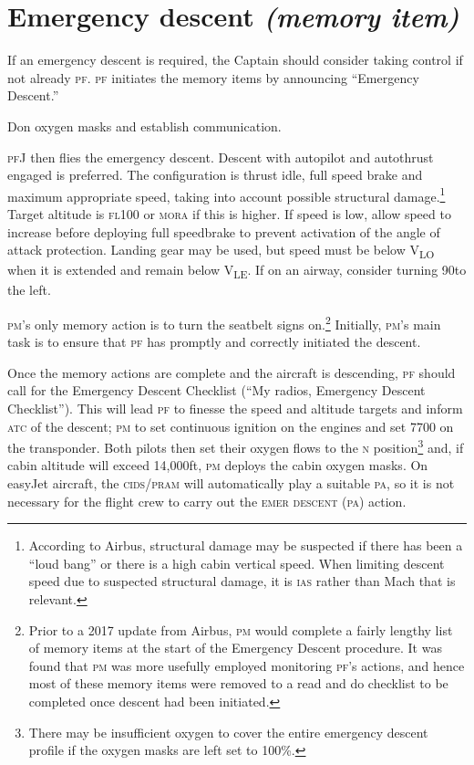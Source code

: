 \documentclass[a5paper,11pt,twoside]{book}
\newcommand{\ac}[1]{{\scshape\MakeLowercase{#1}}}
\newcommand{\ecam}[2]{{\ac{\uline{#1} #2}}}
\newcommand{\V}[1]{V\textsubscript{#1}}
\begin{document}
\section{Emergency descent \emph{(memory item)}}

If an emergency descent is required, the Captain should consider taking control
if not already \ac{PF}. \ac{PF} initiates the memory items by announcing
``Emergency Descent.''

Don oxygen masks and establish communication.

\ac{PF}J then flies the emergency descent.  Descent with autopilot and autothrust
engaged is preferred. The configuration is thrust idle, full speed brake and
maximum appropriate speed, taking into account possible structural
damage.\footnote{According to Airbus, structural damage may be suspected if
there has been a ``loud bang'' or there is a high cabin vertical speed. When
limiting descent speed due to suspected structural damage, it is \ac{IAS} rather
than Mach that is relevant.} Target altitude is \ac{FL100} or \ac{MORA} if this
is higher. If speed is low, allow speed to increase before deploying full
speedbrake to prevent activation of the angle of attack protection. Landing gear
may be used, but speed must be below \V{LO} when it is extended and remain below
\V{LE}. If on an airway, consider turning 90\textdegree{ }to the left.

\ac{PM}'s only memory action is to turn the seatbelt signs on.\footnote{Prior to
a 2017 update from Airbus, \ac{PM} would complete a fairly lengthy list of
memory items at the start of the Emergency Descent procedure. It was found that
\ac{PM} was more usefully employed monitoring \ac{PF}'s actions, and hence most
of these memory items were removed to a read and do checklist to be completed
once descent had been initiated.} Initially, \ac{PM}'s main task is to ensure
that \ac{PF} has promptly and correctly initiated the descent.

Once the memory actions are complete and the aircraft is descending, \ac{PF}
should call for the Emergency Descent Checklist (``My radios, Emergency Descent
Checklist''). This will lead \ac{PF} to finesse the speed and altitude targets and
inform \ac{ATC} of the descent; \ac{PM} to set continuous ignition on the engines and set
7700 on the transponder. Both pilots then set their oxygen flows to the \ac{N}
position\footnote{There may be insufficient oxygen to cover the entire emergency
descent profile if the oxygen masks are left set to 100\%.} and, if cabin
altitude will exceed 14,000ft, \ac{PM} deploys the cabin oxygen masks. On easyJet
aircraft, the \ac{CIDS}/\ac{PRAM} will automatically play a suitable \ac{PA}, so it is not
necessary for the flight crew to carry out the \ecam{}{EMER DESCENT (PA)} action.
\end{document}
